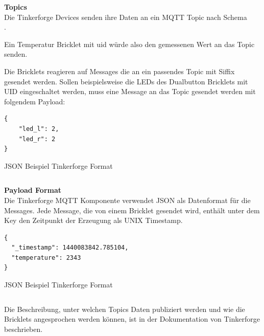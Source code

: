 \textbf{Topics} \\
Die Tinkerforge Devices senden ihre Daten an ein MQTT Topic nach Schema \\ .

Ein Temperatur Bricklet mit \acrfull{uid}  würde also den gemessenen Wert an das Topic \\
 senden.

Die Bricklets reagieren auf Messages die an ein passendes Topic mit Siffix  gesendet werden. Sollen beispielsweise die LEDs des Dualbutton Bricklets mit UID  eingeschaltet werden, muss eine Message an das Topic  gesendet werden mit folgendem Payload:

\begin{listing}[H]
\begin{verbatim}
{
    "led_l": 2,
    "led_r": 2
}
\end{verbatim}
\caption{JSON Beispiel Tinkerforge Format}
\end{listing}
\begin{verbatim}
\end{verbatim}


\textbf{Payload Format} \\
Die Tinkerforge MQTT Komponente verwendet JSON als Datenformat für die Messages. Jede Message, die von einem Bricklet gesendet wird, enthält unter dem Key  den Zeitpunkt der Erzeugung als UNIX Timestamp.

\begin{listing}[H]
\begin{verbatim}
{
  "_timestamp": 1440083842.785104,
  "temperature": 2343
}
\end{verbatim}
\caption{JSON Beispiel Tinkerforge Format}
\end{listing}
\begin{verbatim}
\end{verbatim}

Die Beschreibung, unter welchen Topics Daten publiziert werden und wie die Bricklets angesprochen werden können, ist in der Dokumentation von Tinkerforge \cite{tinkerf:mqtt} beschrieben.


